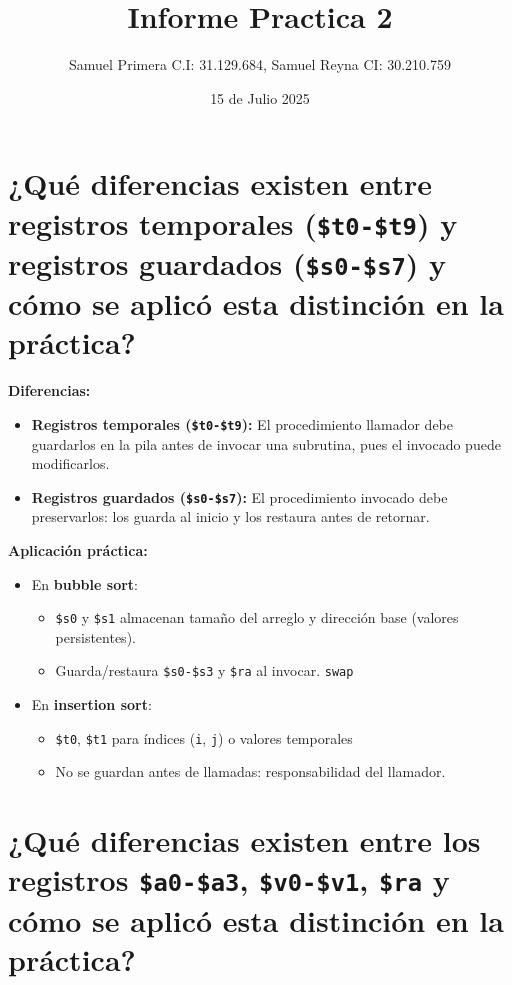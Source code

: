 \documentclass{article}
\title{Informe Practica 2}
\author{Samuel Primera C.I: 31.129.684, Samuel Reyna CI: 30.210.759}
\date{15 de Julio 2025}
\begin{document}
\maketitle

\section{¿Qué diferencias existen entre registros temporales (\texttt{\$t0-\$t9}) y registros guardados (\texttt{\$s0-\$s7}) y cómo se aplicó esta distinción en la práctica?}

\textbf{Diferencias:}
\begin{itemize}
    \item \textbf{Registros temporales (\texttt{\$t0-\$t9}):} 
    El procedimiento llamador debe guardarlos en la pila antes de invocar una subrutina, pues el invocado puede modificarlos.
    \item \textbf{Registros guardados (\texttt{\$s0-\$s7}):} El procedimiento invocado debe preservarlos: los guarda al inicio y los restaura antes de retornar.
\end{itemize}

\textbf{Aplicación práctica:}
\begin{itemize}
    \item En \textbf{bubble sort}:
    \begin{itemize}
        \item \texttt{\$s0} y \texttt{\$s1} almacenan tamaño del arreglo y dirección base (valores persistentes).
        \item Guarda/restaura \texttt{\$s0-\$s3} y \texttt{\$ra} al invocar. \texttt{swap}
    \end{itemize}
    \item En \textbf{insertion sort}:
    \begin{itemize}
        \item \texttt{\$t0}, \texttt{\$t1} para índices (\texttt{i}, \texttt{j}) o valores temporales
        \item No se guardan antes de llamadas: responsabilidad del llamador.
    \end{itemize}
\end{itemize}

\section{¿Qué diferencias existen entre los registros \texttt{\$a0-\$a3}, \texttt{\$v0-\$v1}, \texttt{\$ra} y cómo se aplicó esta distinción en la práctica?}
\end{document}
